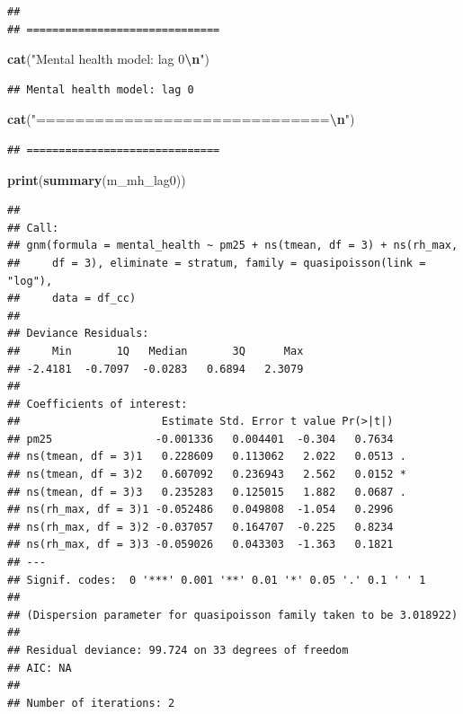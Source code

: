 \documentclass[
]{article}
\newenvironment{Shaded}{\begin{snugshade}}{\end{snugshade}}
\newcommand{\FunctionTok}[1]{\textcolor[rgb]{0.13,0.29,0.53}{\textbf{#1}}}
\newcommand{\NormalTok}[1]{#1}
\newcommand{\SpecialCharTok}[1]{\textcolor[rgb]{0.81,0.36,0.00}{\textbf{#1}}}
\newcommand{\StringTok}[1]{\textcolor[rgb]{0.31,0.60,0.02}{#1}}
\begin{document}
\begin{verbatim}
## 
## ==============================
\end{verbatim}

\begin{Shaded}
\begin{Highlighting}[]
\FunctionTok{cat}\NormalTok{(}\StringTok{"Mental health model: lag 0}\SpecialCharTok{\textbackslash{}n}\StringTok{"}\NormalTok{)}
\end{Highlighting}
\end{Shaded}

\begin{verbatim}
## Mental health model: lag 0
\end{verbatim}

\begin{Shaded}
\begin{Highlighting}[]
\FunctionTok{cat}\NormalTok{(}\StringTok{"==============================}\SpecialCharTok{\textbackslash{}n}\StringTok{"}\NormalTok{)}
\end{Highlighting}
\end{Shaded}

\begin{verbatim}
## ==============================
\end{verbatim}

\begin{Shaded}
\begin{Highlighting}[]
\FunctionTok{print}\NormalTok{(}\FunctionTok{summary}\NormalTok{(m\_mh\_lag0))}
\end{Highlighting}
\end{Shaded}

\begin{verbatim}
## 
## Call:
## gnm(formula = mental_health ~ pm25 + ns(tmean, df = 3) + ns(rh_max, 
##     df = 3), eliminate = stratum, family = quasipoisson(link = "log"), 
##     data = df_cc)
## 
## Deviance Residuals: 
##     Min       1Q   Median       3Q      Max  
## -2.4181  -0.7097  -0.0283   0.6894   2.3079  
## 
## Coefficients of interest:
##                      Estimate Std. Error t value Pr(>|t|)  
## pm25                -0.001336   0.004401  -0.304   0.7634  
## ns(tmean, df = 3)1   0.228609   0.113062   2.022   0.0513 .
## ns(tmean, df = 3)2   0.607092   0.236943   2.562   0.0152 *
## ns(tmean, df = 3)3   0.235283   0.125015   1.882   0.0687 .
## ns(rh_max, df = 3)1 -0.052486   0.049808  -1.054   0.2996  
## ns(rh_max, df = 3)2 -0.037057   0.164707  -0.225   0.8234  
## ns(rh_max, df = 3)3 -0.059026   0.043303  -1.363   0.1821  
## ---
## Signif. codes:  0 '***' 0.001 '**' 0.01 '*' 0.05 '.' 0.1 ' ' 1
## 
## (Dispersion parameter for quasipoisson family taken to be 3.018922)
## 
## Residual deviance: 99.724 on 33 degrees of freedom
## AIC: NA
## 
## Number of iterations: 2
\end{verbatim}
\end{document}
